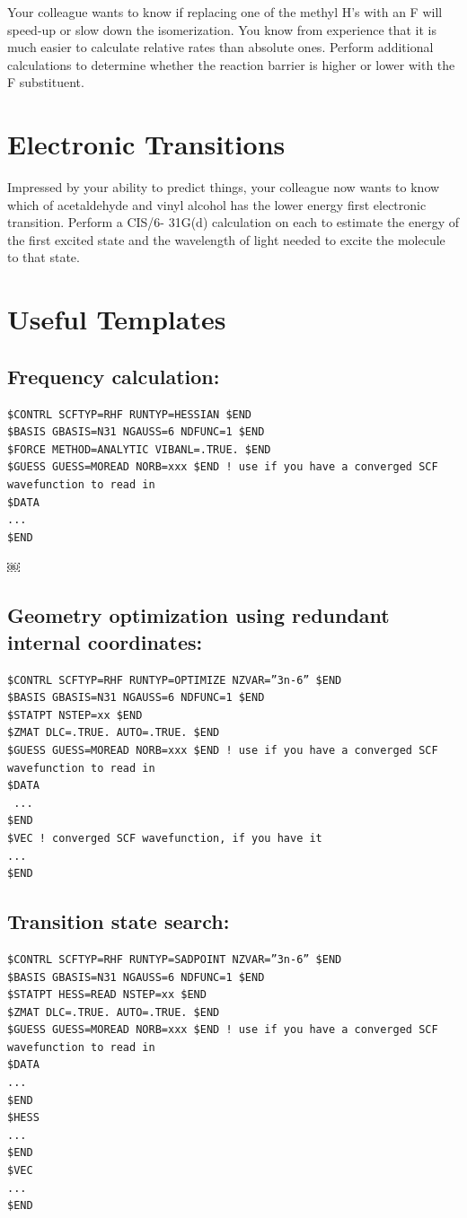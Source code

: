 \documentclass[11pt]{article}
\begin{document}
Your colleague wants to know if replacing one of the methyl H’s with an F will speed-up or slow down the isomerization. You know from experience that it is much easier to calculate relative rates than absolute ones. Perform additional calculations to determine whether the reaction barrier is higher or lower with the F substituent.

\section{Electronic Transitions}
\label{sec-4}

Impressed by your ability to predict things, your colleague now wants to know which of acetaldehyde and vinyl alcohol has the lower energy first electronic transition. Perform a CIS/6- 31G(d) calculation on each to estimate the energy of the first excited state and the wavelength of light needed to excite the molecule to that state.

\section{Useful Templates}
\label{sec-5}

\subsection{Frequency calculation:}
\label{sec-5-1}
\begin{verbatim}
$CONTRL SCFTYP=RHF RUNTYP=HESSIAN $END
$BASIS GBASIS=N31 NGAUSS=6 NDFUNC=1 $END
$FORCE METHOD=ANALYTIC VIBANL=.TRUE. $END
$GUESS GUESS=MOREAD NORB=xxx $END ! use if you have a converged SCF wavefunction to read in 
$DATA
... 
$END
\end{verbatim}

￼
\subsection{Geometry optimization using redundant internal coordinates:}
\label{sec-5-2}
\begin{verbatim}
$CONTRL SCFTYP=RHF RUNTYP=OPTIMIZE NZVAR=”3n-6” $END 
$BASIS GBASIS=N31 NGAUSS=6 NDFUNC=1 $END
$STATPT NSTEP=xx $END
$ZMAT DLC=.TRUE. AUTO=.TRUE. $END
$GUESS GUESS=MOREAD NORB=xxx $END ! use if you have a converged SCF wavefunction to read in
$DATA
 ...
$END
$VEC ! converged SCF wavefunction, if you have it 
...
$END
\end{verbatim}


\subsection{Transition state search:}
\label{sec-5-3}
\begin{verbatim}
$CONTRL SCFTYP=RHF RUNTYP=SADPOINT NZVAR=”3n-6” $END 
$BASIS GBASIS=N31 NGAUSS=6 NDFUNC=1 $END
$STATPT HESS=READ NSTEP=xx $END
$ZMAT DLC=.TRUE. AUTO=.TRUE. $END
$GUESS GUESS=MOREAD NORB=xxx $END ! use if you have a converged SCF wavefunction to read in
$DATA
... 
$END 
$HESS
... 
$END 
$VEC
... 
$END
\end{verbatim}
\end{document}
